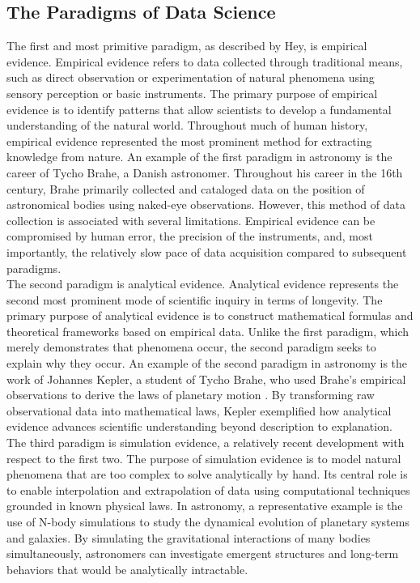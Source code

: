 \documentclass[manuscript,linenumbers,longauthor]{aastex631}
\begin{document}
\subsection{The Paradigms of Data Science}
The first and most primitive paradigm, as described by Hey, is empirical evidence. Empirical evidence refers to data collected through traditional means, such as direct observation or experimentation of natural phenomena using sensory perception or basic instruments. The primary purpose of empirical evidence is to identify patterns that allow scientists to develop a fundamental understanding of the natural world. Throughout much of human history, empirical evidence represented the most prominent method for extracting knowledge from nature. An example of the first paradigm in astronomy is the career of Tycho Brahe, a Danish astronomer. Throughout his career in the 16th century, Brahe primarily collected and cataloged data on the position of astronomical bodies using naked-eye observations. However, this method of data collection is associated with several limitations. Empirical evidence can be compromised by human error, the precision of the instruments, and, most importantly, the relatively slow pace of data acquisition compared to subsequent paradigms.
\\ \hspace*{2em}The second paradigm is analytical evidence. Analytical evidence represents the second most prominent mode of scientific inquiry in terms of longevity. The primary purpose of analytical evidence is to construct mathematical formulas and theoretical frameworks based on empirical data. Unlike the first paradigm, which merely demonstrates that phenomena occur, the second paradigm seeks to explain why they occur. An example of the second paradigm in astronomy is the work of Johannes Kepler, a student of Tycho Brahe, who used Brahe's empirical observations to derive the laws of planetary motion \citep{heyFourthParadigmDataIntensive2009}. By transforming raw observational data into mathematical laws, Kepler exemplified how analytical evidence advances scientific understanding beyond description to explanation.
\\ \hspace*{2em}The third paradigm is simulation evidence, a relatively recent development with respect to the first two. The purpose of simulation evidence is to model natural phenomena that are too complex to solve analytically by hand. Its central role is to enable interpolation and extrapolation of data using computational techniques grounded in known physical laws. In astronomy, a representative example is the use of N-body simulations to study the dynamical evolution of planetary systems and galaxies. By simulating the gravitational interactions of many bodies simultaneously, astronomers can investigate emergent structures and long-term behaviors that would be analytically intractable.
\end{document}
